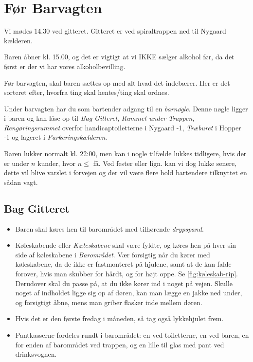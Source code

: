 \section{Før Barvagten}
\label{sec:pre-barvagten}

Vi mødes 14.30 ved gitteret. Gitteret er ved spiraltrappen ned til Nygaard kælderen.

Baren åbner kl. 15.00, og det er vigtigt
at vi IKKE sælger alkohol før, da det først er der vi har vores alkoholbevilling.

Før barvagten, skal baren sættes op med alt hvad det indebærer. Her er
det sorteret efter, hvorfra ting skal hentes/ting skal ordnes.

Under barvagten har du som bartender adgang til en \textit{barnøgle}.
Denne nøgle ligger i baren og kan låse op til \textit{Bag Gitteret},
\textit{Rummet under Trappen}, 
\textit{Rengøringsrummet} overfor handicaptoiletterne i Nygaard -1,
\textit{Træburet} i Hopper -1
og lageret i \textit{Parkeringskælderen}.

Baren lukker normalt kl. 22:00, men kan i nogle tilfælde lukkes tidligere, hvis der er under
$n$ kunder, hvor $n \le$ få. 
Ved fester eller lign. kan vi dog lukke senere, dette vil blive varslet i forvejen og der vil
være flere hold bartendere tilknyttet en sådan vagt.

\subsection{Bag Gitteret}
\label{sec:pre:bag-ved-gitteret}

\begin{itemize}
	\item Baren skal køres hen til barområdet med tilhørende \textit{drypspand}.
	\item Køleskabende eller \textit{Kæleskabene} skal være fyldte, og køres hen på hver sin side af køleskabene i
	\textit{Barområdet}. Vær forsigtig når du kører med køleskabene, da de ikke er fastmonteret på hjulene,
	samt at de kan falde forover, hvis man skubber for hårdt, og for højt oppe. Se \autoref{fig:køleskab-rip}. Derudover skal
	du passe på, at du ikke kører ind i noget på vejen. Skulle noget af indholdet ligge sig op af døren, kan man lægge en jakke
	ned under, og forsigtigt åbne, mens man griber flasker inde mellem døren.
	\item Hvis det er den første fredag i måneden, så tag også lykkehjulet frem.
	\item Pantkasserne fordeles rundt i barområdet: en ved toiletterne, en ved baren, en for enden af barområdet ved trappen, og en lille til glas med pant ved drinksvognen.
\end{itemize}

